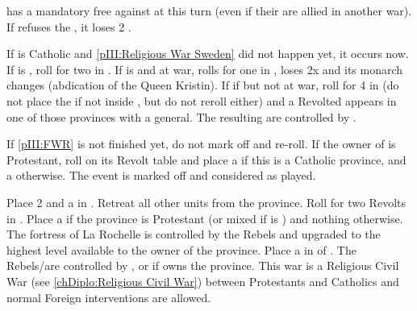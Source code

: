 









\phevnt
\aparag \SUE has a mandatory free \CB against \paysDanemark at this turn (even
if their are allied in another war).
\aparag If \SUE refuses the \CB, it loses 2 \STAB.





\phevnt
\aparag If \SUE is Catholic and \ref{pIII:Religious War Sweden} did not happen
yet, it occurs now.
\aparag If \SUE is \PROTRIG, roll for two \REVOLT in \SUE.
\aparag If \SUE is \PROTTOL and at war, rolls for one \REVOLT in \SUE, \SUE
loses 2x \STAB and its monarch changes (abdication of the Queen Kristin).
\aparag If \SUE if \PROTTOL but not at war, roll for 4 \REVOLT in \SUE (do not
place the \REVOLT if not inside \SUE, but do not reroll either) and a Revolted
\ARMY appears in one of those provinces with a general.
\aparag The resulting \REVOLT are controlled by \SPA.




\condition{}
\aparag If \ref{pIII:FWR} is not finished yet, do not mark off and re-roll.
\aparag If the owner of \provincePoitou is Protestant, roll on its Revolt
table and place a \REVOLT\Faceplus if this is a Catholic province, and a
\REVOLT\Facemoins otherwise. The event is marked off and considered as played.

\phevnt
\aparag Place 2 \REVOLT \faceplus and a \LD in \provincePoitou.  Retreat all
other units from the province.
\bparag Roll for two Revolts in \FRA. Place a \REVOLT\Facemoins if the
province is Protestant (or mixed if \FRA is \CATHCR) and nothing otherwise.
\aparag The fortress of La Rochelle is controlled by the Rebels and upgraded
to the highest level available to the owner of the province.
\aparag Place a \PIRATE\faceplus in \CTZ of \FRA.
\aparag The Rebels/\REVOLT are controlled by \ENG, or \FRA if \ENG owns the
province. This war is a Religious Civil War (see \ref{chDiplo:Religious Civil
  War}) between Protestants and Catholics and normal Foreign interventions are
allowed.

